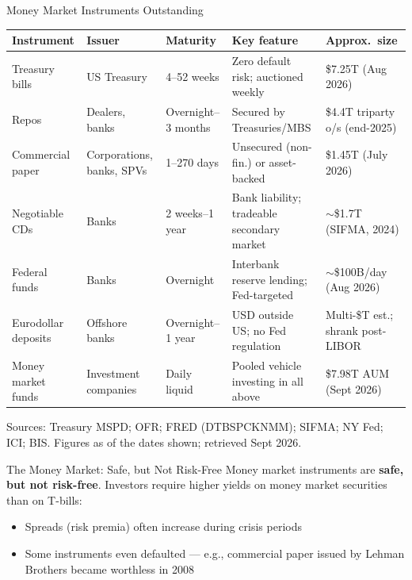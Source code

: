\documentclass[aspectratio=169]{beamer}
\begin{document}
\begin{frame}{Money Market Instruments Outstanding}
\begin{table}
\centering
\scriptsize
\begin{tabular}{p{}p{}p{}p{}p{}}
\toprule
\textbf{Instrument} & \textbf{Issuer} & \textbf{Maturity} & \textbf{Key feature} & \textbf{Approx.\ size} \\
\midrule
Treasury bills & US Treasury & 4--52 weeks & Zero default risk; auctioned weekly & \$7.25T (Aug 2026) \\
Repos & Dealers, banks & Overnight--3 months & Secured by Treasuries/MBS & \$4.4T triparty o/s (end-2025) \\
Commercial paper & Corporations, banks, SPVs & 1--270 days & Unsecured (non-fin.) or asset-backed & \$1.45T (July 2026) \\
Negotiable CDs & Banks & 2 weeks--1 year & Bank liability; tradeable secondary market & $\sim$\$1.7T (SIFMA, 2024) \\
Federal funds & Banks & Overnight & Interbank reserve lending; Fed-targeted & $\sim$\$100B/day (Aug 2026) \\
Eurodollar deposits & Offshore banks & Overnight--1 year & USD outside US; no Fed regulation & Multi-\$T est.; shrank post-LIBOR \\
Money market funds & Investment companies & Daily liquid & Pooled vehicle investing in all above & \$7.98T AUM (Sept 2026) \\
\bottomrule
\end{tabular}
\end{table}
\begin{center}
\small Sources: Treasury MSPD; OFR; FRED (DTBSPCKNMM); SIFMA; NY Fed; ICI; BIS. Figures as of the dates shown; retrieved Sept 2026.
\end{center}
\end{frame}

\begin{frame}{The Money Market: Safe, but Not Risk-Free}
Money market instruments are \textbf{safe, but not risk-free}. Investors require higher yields on money market securities than on T-bills:
\begin{itemize}
  \item Spreads (risk premia) often increase during crisis periods
  \item Some instruments even defaulted --- e.g., commercial paper issued by Lehman Brothers became worthless in 2008
\end{itemize}
\end{frame}
\end{document}
